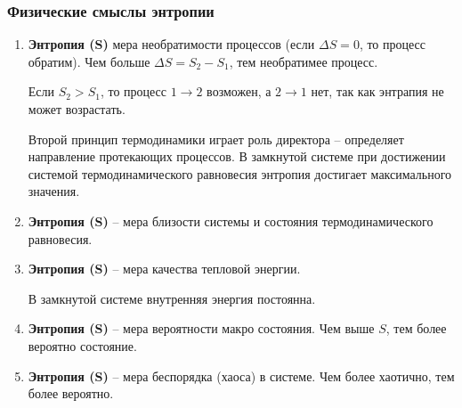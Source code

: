 \subsubsection*{Физические смыслы энтропии}
\begin{enumerate}
	\item \textbf{Энтропия (S)} мера необратимости процессов (если $\Delta S = 0$, то процесс обратим). Чем больше $\Delta S = S_2 - S_1$, тем необратимее процесс.

	Если $S_2 > S_1$, то процесс $1 \to 2$ возможен, а $2 \to 1$ нет, так как энтрапия не может возрастать.

	Второй принцип термодинамики играет роль директора -- определяет направление протекающих процессов. В замкнутой системе при достижении системой термодинамического равновесия энтропия достигает максимального значения.
	\item \textbf{Энтропия (S)} -- мера близости системы и состояния термодинамического равновесия.
	\item \textbf{Энтропия (S)} -- мера качества тепловой энергии.

	В замкнутой системе внутренняя энергия постоянна.
	\item \textbf{Энтропия (S)} -- мера вероятности макро состояния. Чем выше $S$, тем более вероятно состояние.
	\item \textbf{Энтропия (S)} -- мера беспорядка (хаоса) в системе. Чем более хаотично, тем более вероятно.
\end{enumerate}